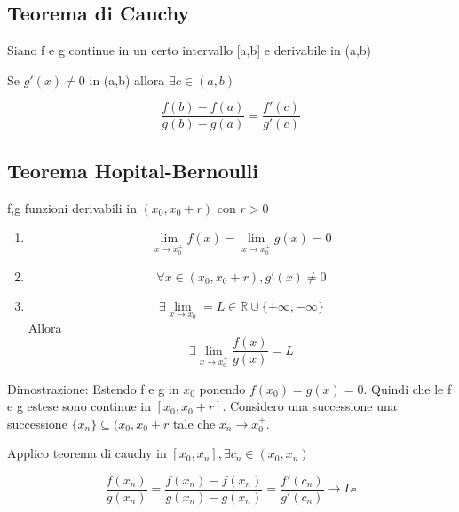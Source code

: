 \documentclass{article}
\begin{document}
        \subsection{Teorema di Cauchy}
        \begin{flushleft}
          Siano f e g continue in un certo intervallo [a,b] e derivabile in (a,b)
        \end{flushleft}
        \begin{flushleft}
          Se $g'(x) \neq 0$ in (a,b) allora $\exists c \in (a,b)$
        \end{flushleft}
        \begin{equation}
          \frac{f(b)-f(a)}{g(b)-g(a)}=\frac{f'(c)}{g'(c)}
        \end{equation}
        \subsection{Teorema Hopital-Bernoulli}
        \begin{flushleft}
          f,g funzioni derivabili in $(x_0,x_0+r)$ con $r>0$
        \end{flushleft}
        \begin{enumerate}
          \item 
            \begin{equation}
              \lim_{x \to x_0^+} f(x)=\lim_{x \to x_0^+} g(x)=0
          \end{equation}
        \item 
          \begin{equation}
            \forall x \in (x_0,x_0+r), g'(x) \neq 0
          \end{equation}
        \item 
          \begin{equation}
            \exists \lim_{x \to x_0}=L \in \mathbb{R} \cup \{ +\infty, -\infty \}
          \end{equation}
          Allora 
            \begin{equation}
              \exists \lim_{x \to x_0^+} \frac{f(x)}{g(x)}=L
            \end{equation}
        \end{enumerate}
        \begin{flushleft}
          Dimostrazione: Estendo f e g in $x_0$ ponendo $f(x_0)=g(x)=0$. Quindi che le f e g estese sono continue in $[x_0,x_0+r]$.
          Considero una successione una successione $\{ x_n \} \subseteq (x_0,x_0+r$ tale che $x_n \to x_0^+$.
        \end{flushleft}
        \begin{flushleft}
          Applico teorema di cauchy in $[x_0,x_n], \exists c_n \in (x_0,x_n)$
        \end{flushleft}
        \begin{equation}
          \frac{f(x_n)}{g(x_n)}=\frac{f(x_n)-f(x_n)}{g(x_n)-g(x_n)}=\frac{f'(c_n)}{g'(c_n)} \to L \square
        \end{equation}
\end{document}
